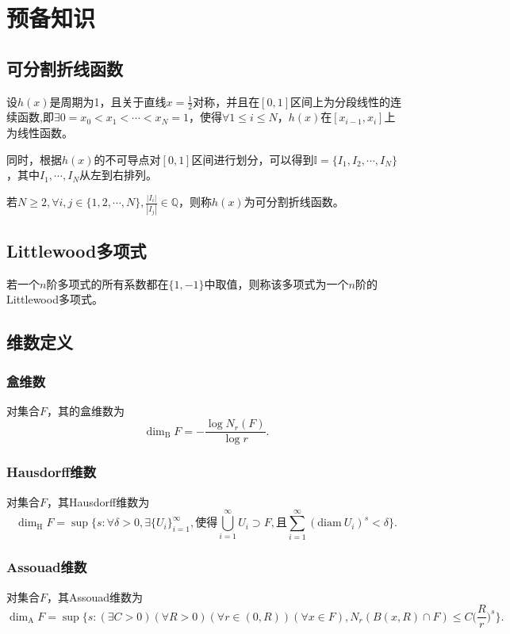 \section{预备知识}
\subsection{可分割折线函数}

设$h(x)$是周期为1，且关于直线$x=\frac{1}{2}$对称，并且在$[0,1]$区间上为分段线性的连续函数,即$\exists0=x_0<x_1<\cdots<x_N=1$，使得$\forall 1\le i\le N$，$h(x)$在$[x_{i-1},x_i]$上为线性函数。

同时，根据$h(x)$的不可导点对$[0,1]$区间进行划分，可以得到$\mathbb{I}=\{I_1,I_2,\cdots,I_N\}$，其中$I_1,\cdots,I_N$从左到右排列。

若$N\ge2,\forall i,j\in\{1,2,\cdots,N\},\frac{|I_i|}{|I_j|}\in\mathbb{Q}$，则称$h(x)$为可分割折线函数。

\subsection{Littlewood多项式}
若一个$n$阶多项式的所有系数都在$\{1,-1\}$中取值，则称该多项式为一个$n$阶的Littlewood多项式。

\subsection{维数定义}
\subsubsection{盒维数}
对集合$F$，其的盒维数为
$$
      \mathrm{\dim_B}F=-\frac{\log N_r(F)}{\log r}.
$$

\subsubsection{Hausdorff维数}
对集合$F$，其Hausdorff维数为
$$
      \mathrm{\dim_H}F=\sup\{s:\forall\delta>0,\exists\{U_i\}_{i=1}^\infty,\mbox{使得}\bigcup_{i=1}^\infty U_i\supset F,\mbox{且}\sum_{i=1}^\infty (\mathrm{diam}~U_i)^s<\delta\}.
$$

\subsubsection{Assouad维数}
对集合$F$，其Assouad维数为
$$
      \mathrm{\dim_A}F=\sup\{s:(\exists C>0)(\forall R>0)(\forall r\in(0,R))(\forall x\in F),N_r(B(x,R)\cap F)\le C\Big(\frac{R}{r}\Big)^s\}.
$$

